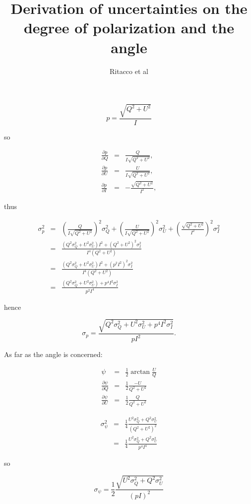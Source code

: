 \documentclass[a4paper,10pt]{article}
\title{Derivation of uncertainties on the degree of polarization and the angle}
\author{Ritacco et al}
\begin{document}
\maketitle

\begin{equation}
 p    = \frac{\sqrt{Q^2 + U^2}}{I} \nonumber 
\end{equation}

so

\begin{eqnarray}
\frac{\partial p}{\partial Q} &=& \frac{Q}{I\sqrt{Q^2+U^2}}, \\
\frac{\partial p}{\partial U} &=& \frac{U}{I\sqrt{Q^2+U^2}}, \\
\frac{\partial p}{\partial I} &=& -\frac{\sqrt{Q^2+U^2}}{I^2},
\end{eqnarray}

thus

\begin{eqnarray}
\sigma_p^2 &=& \left(\frac{Q}{I\sqrt{Q^2+U^2}}\right)^2\sigma_Q^2 + 
\left(\frac{U}{I\sqrt{Q^2+U^2}}\right)^2\sigma_U^2 + 
\left(\frac{\sqrt{Q^2+U^2}}{I^2}\right)^2\sigma_I^2\\
&=&\frac{(Q^2\sigma_Q^2 + U^2\sigma_U^2)I^2 +
  (Q^2+U^2)^2\sigma_I^2}{I^4(Q^2+U^2)} \\
&=&\frac{(Q^2\sigma_Q^2 + U^2\sigma_U^2)I^2 +
  (p^2I^2)^2\sigma_I^2}{I^4(Q^2+U^2)} \\
&=&\frac{(Q^2\sigma_Q^2+U^2\sigma_U^2)+p^4I^2\sigma_I^2}{p^2I^4}
\end{eqnarray}

hence

\begin{equation}
\sigma_p = \frac{\sqrt{Q^2\sigma_Q^2+U^2\sigma_U^2+p^4I^2\sigma_I^2}}{pI^2}.
\end{equation}

As far as the angle is concerned:

\begin{eqnarray}
\psi & = & \frac{1}{2}\arctan{\frac{U}{Q}}\\
\frac{\partial \psi}{\partial Q} &=& \frac{1}{2}\frac{-U}{Q^2+U^2} \\
\frac{\partial \psi}{\partial U} &=& \frac{1}{2}\frac{Q}{Q^2+U^2}
\end{eqnarray}

\begin{eqnarray}
\sigma_\psi^2 &=& \frac{1}{4}\frac{U^2\sigma_Q^2+Q^2\sigma_U^2}{(Q^2+U^2)^2}\\
&=&\frac{1}{4}\frac{U^2\sigma_Q^2+Q^2\sigma_U^2}{p^4I^4}
\end{eqnarray}

so

\begin{equation}
\sigma_\psi = \frac{1}{2}\frac{\sqrt{U^2\sigma_Q^2+Q^2\sigma_U^2}}{(pI)^2}
\end{equation}
\end{document}
